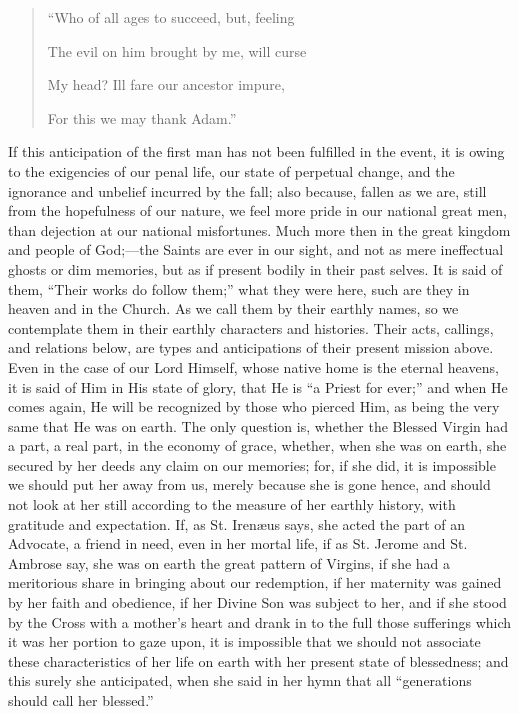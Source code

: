 \begin{quote}

``Who of all ages to succeed, but, feeling

The evil on him brought by me, will curse

My head? Ill fare our ancestor impure,

For this we may thank Adam.''

\end{quote}

If this anticipation of the first man has not been fulfilled in the
event, it is owing to the exigencies of our penal life, our state of
perpetual change, and the ignorance and unbelief incurred by the fall;
also because, fallen as we are, still from the hopefulness of our
nature, we feel more pride in our national great men, than dejection at
our national misfortunes. Much more then in the great kingdom and people
of God;—the Saints are ever in our sight, and not as mere ineffectual
ghosts or dim memories, but as if present bodily in their past selves.
It is said of them, ``Their works do follow them;'' what they
were here, such are they in heaven and in the Church. As we call them by
their earthly names, so we contemplate them in their earthly characters
and histories. Their acts, callings, and relations below, are types and
anticipations of their present mission above. Even in the case of
our Lord Himself, whose native home is the eternal heavens, it is said
of Him in His state of glory, that He is ``a Priest for ever;''
and when He comes again, He will be recognized by those who pierced Him,
as being the very same that He was on earth. The only question is,
whether the Blessed Virgin had a part, a real part, in the economy of
grace, whether, when she was on earth, she secured by her deeds any
claim on our memories; for, if she did, it is impossible we should put
her away from us, merely because she is gone hence, and should not look
at her still according to the measure of her earthly history, with
gratitude and expectation. If, as St. Irenæus says, she acted the part
of an Advocate, a friend in need, even in her mortal life, if as St.
Jerome and St. Ambrose say, she was on earth the great pattern of
Virgins, if she had a meritorious share in bringing about our
redemption, if her maternity was gained by her faith and obedience, if
her Divine Son was subject to her, and if she stood by the Cross with a
mother's heart and drank in to the full those sufferings which it was
her portion to gaze upon, it is impossible that we should not associate
these characteristics of her life on earth with her present state of
blessedness; and this surely she anticipated, when she said in her hymn
that all ``generations should call her blessed.''

